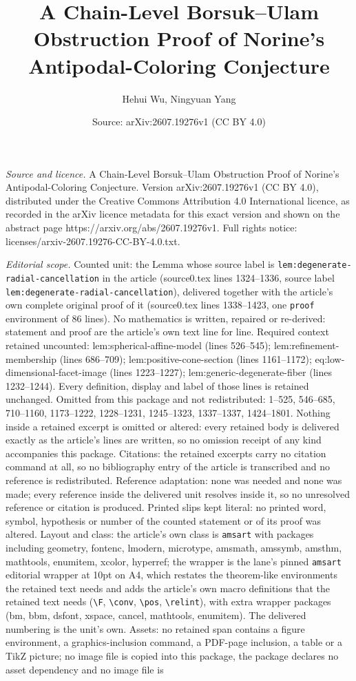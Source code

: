 \documentclass[10pt,a4paper]{amsart}
\title[A Chain-Level Borsuk--Ulam Obstruction Proof of Norine's Ant]{A Chain-Level Borsuk--Ulam Obstruction Proof of Norine's Antipodal-Coloring Conjecture}
\author{Hehui Wu, Ningyuan Yang}
\date{Source: arXiv:2607.19276v1 (CC BY 4.0)}
\begin{document}
\maketitle

\noindent\emph{Source and licence.} A Chain-Level Borsuk--Ulam Obstruction Proof of Norine's Antipodal-Coloring Conjecture. Version arXiv:2607.19276v1 (CC BY 4.0), distributed under the Creative Commons Attribution 4.0 International licence, as recorded in the arXiv licence metadata for this exact version and shown on the abstract page https://arxiv.org/abs/2607.19276v1. Full rights notice: licenses/arxiv-2607.19276-CC-BY-4.0.txt.\par\smallskip

\noindent\textit{Editorial scope.} Counted unit: the Lemma whose source label is \texttt{lem:degenerate-radial-cancellation} in the article (source0.tex lines 1324--1336, source label \texttt{lem:degenerate-radial-cancellation}), delivered together with the article's own complete original proof of it (source0.tex lines 1338--1423, one \texttt{proof} environment of 86 lines). No mathematics is written, repaired or re-derived: statement and proof are the article's own text line for line. Required context retained uncounted: lem:spherical-affine-model (lines 526--545); lem:refinement-membership (lines 686--709); lem:positive-cone-section (lines 1161--1172); eq:low-dimensional-facet-image (lines 1223--1227); lem:generic-degenerate-fiber (lines 1232--1244). Every definition, display and label of those lines is retained unchanged. Omitted from this package and not redistributed: 1--525, 546--685, 710--1160, 1173--1222, 1228--1231, 1245--1323, 1337--1337, 1424--1801. Nothing inside a retained excerpt is omitted or altered: every retained body is delivered exactly as the article's lines are written, so no omission receipt of any kind accompanies this package. Citations: the retained excerpts carry no citation command at all, so no bibliography entry of the article is transcribed and no reference is redistributed. Reference adaptation: none was needed and none was made; every reference inside the delivered unit resolves inside it, so no unresolved reference or citation is produced. Printed slips kept literal: no printed word, symbol, hypothesis or number of the counted statement or of its proof was altered. Layout and class: the article's own class is \texttt{amsart} with packages including geometry, fontenc, lmodern, microtype, amsmath, amssymb, amsthm, mathtools, enumitem, xcolor, hyperref; the wrapper is the lane's pinned \texttt{amsart} editorial wrapper at 10pt on A4, which restates the theorem-like environments the retained text needs and adds the article's own macro definitions that the retained text needs (\texttt{\textbackslash F}, \texttt{\textbackslash conv}, \texttt{\textbackslash pos}, \texttt{\textbackslash relint}), with extra wrapper packages (bm, bbm, dsfont, xspace, cancel, mathtools, enumitem). The delivered numbering is the unit's own. Assets: no retained span contains a figure environment, a graphics-inclusion command, a PDF-page inclusion, a table or a TikZ picture; no image file is copied into this package, the package declares no asset dependency and no image file is 
\end{document}
